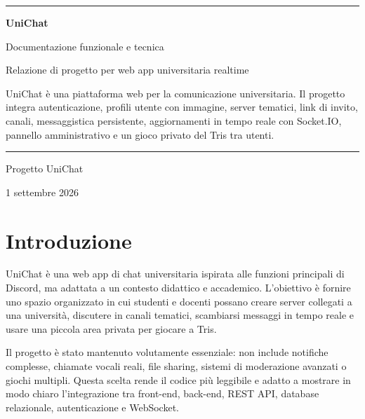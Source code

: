 \documentclass[11pt,a4paper]{article}
\begin{document}
\hypersetup{pageanchor=false}
\begin{titlepage}
  \pagecolor{UniBlueLight}
  \color{TextGray}
  \centering
  \vspace*{1.2cm}
  {\color{UniBlueDark}\rule{\textwidth}{1.2pt}}\par
  \vspace{1.5cm}
  {\Huge\bfseries\color{UniBlueDark} UniChat\par}
  \vspace{0.45cm}
  {\Large Documentazione funzionale e tecnica\par}
  \vspace{0.8cm}
  {\large Relazione di progetto per web app universitaria realtime\par}
  \vfill
  \begin{minipage}{0.78\textwidth}
    \large
UniChat è una piattaforma web per la comunicazione universitaria. Il progetto integra autenticazione, profili utente con immagine, server tematici, link di invito, canali, messaggistica persistente, aggiornamenti in tempo reale con Socket.IO, pannello amministrativo e un gioco privato del Tris tra utenti.
  \end{minipage}
  \vfill
  {\color{UniBlueDark}\rule{\textwidth}{1.2pt}}\par
  \vspace{0.45cm}
  {\large Progetto UniChat\par}
  {\large 1 settembre 2026\par}
\end{titlepage}
\nopagecolor

\hypersetup{pageanchor=true}
\tableofcontents
\newpage
{}

\section{Introduzione}

UniChat è una web app di chat universitaria ispirata alle funzioni principali di Discord, ma adattata a un contesto didattico e accademico. L'obiettivo è fornire uno spazio organizzato in cui studenti e docenti possano creare server collegati a una università, discutere in canali tematici, scambiarsi messaggi in tempo reale e usare una piccola area privata per giocare a Tris.

Il progetto è stato mantenuto volutamente essenziale: non include notifiche complesse, chiamate vocali reali, file sharing, sistemi di moderazione avanzati o giochi multipli. Questa scelta rende il codice più leggibile e adatto a mostrare in modo chiaro l'integrazione tra front-end, back-end, REST API, database relazionale, autenticazione e WebSocket.
\end{document}
